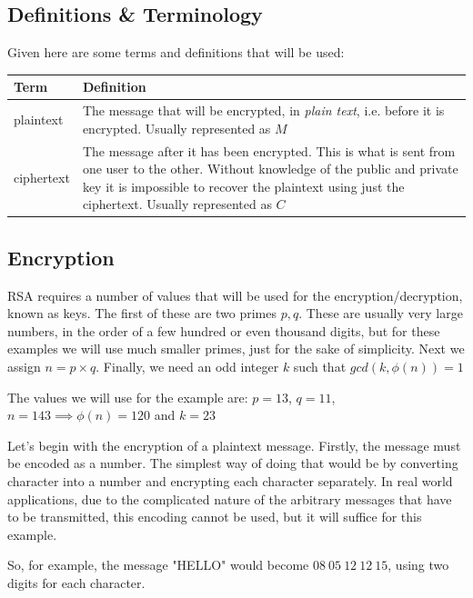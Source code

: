 \documentclass{article}
\begin{document}
    \subsection{Definitions \& Terminology}
    Given here are some terms and definitions that will be used:
    \begin{table}[H]
        \begin{tabular}{ | m{5em} | p{30em} | }
            \hline
            Term      & Definition\\
            \hline
            plaintext & The message that will be encrypted, in \emph{plain text}, i.e. before it is
                        encrypted. Usually represented as $M$\\
            \hline
            ciphertext & The message after it has been encrypted. This is what is sent from one
                         user to the other. Without knowledge of the public and private key it 
                         is impossible to recover the plaintext using just the ciphertext. Usually
                         represented as $C$\\
            \hline
        \end{tabular}
    \end{table}
    \subsection{Encryption}
    RSA requires a number of values that will be used for the encryption/decryption, known as keys.
    The first of these are two primes $p,q$. These are usually very large numbers, in the order
    of a few hundred or even thousand digits, but for these examples we will use much smaller primes,
    just for the sake of simplicity. Next we assign $n=p \times q$. Finally, we need an odd 
    integer $k$ such that $gcd(k, \phi (n)) = 1$ 

    The values we will use for the example are: $p=13$, $q=11$, $n=143 \implies \phi (n) = 120$
    and $k = 23$

    Let's begin with the encryption of a plaintext message. Firstly, the message must be encoded
    as a number. The simplest way of doing that would be by converting character into a number 
    and encrypting each character separately. In real world applications, due to the complicated nature of the 
    arbitrary messages that have to be transmitted, this encoding cannot be used, but it will suffice for this 
    example.

    So, for example, the message "HELLO" would become $08\ 05\ 12\ 12\ 15$, using two digits for 
    each character.
\end{document}
